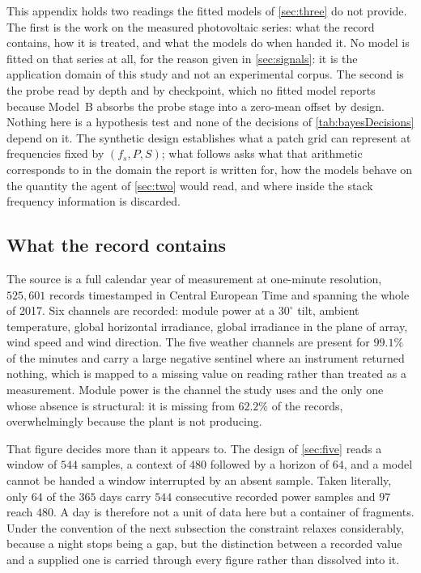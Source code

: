This appendix holds two readings the fitted models of \autoref{sec:three} do not provide. The first is the work on the measured photovoltaic series: what the record contains, how it is treated, and what the models do when handed it. No model is fitted on that series at all, for the reason given in \autoref{sec:signals}: it is the application domain of this study and not an experimental corpus. The second is the probe read by depth and by checkpoint, which no fitted model reports because Model~B absorbs the probe stage into a zero-mean offset by design. Nothing here is a hypothesis test and none of the decisions of \autoref{tab:bayesDecisions} depend on it. The synthetic design establishes what a patch grid can represent at frequencies fixed by $(f_s,P,S)$; what follows asks what that arithmetic corresponds to in the domain the report is written for, how the models behave on the quantity the agent of \autoref{sec:two} would read, and where inside the stack frequency information is discarded.

\subsection{What the record contains}

The source is a full calendar year of measurement at one-minute resolution, $525{,}601$ records timestamped in Central European Time and spanning the whole of 2017. Six channels are recorded: module power at a $30^\circ$ tilt, ambient temperature, global horizontal irradiance, global irradiance in the plane of array, wind speed and wind direction. The five weather channels are present for $99.1\%$ of the minutes and carry a large negative sentinel where an instrument returned nothing, which is mapped to a missing value on reading rather than treated as a measurement. Module power is the channel the study uses and the only one whose absence is structural: it is missing from $62.2\%$ of the records, overwhelmingly because the plant is not producing.

That figure decides more than it appears to. The design of \autoref{sec:five} reads a window of $544$ samples, a context of $480$ followed by a horizon of $64$, and a model cannot be handed a window interrupted by an absent sample. Taken literally, only $64$ of the $365$ days carry $544$ consecutive recorded power samples and $97$ reach $480$. A day is therefore not a unit of data here but a container of fragments. Under the convention of the next subsection the constraint relaxes considerably, because a night stops being a gap, but the distinction between a recorded value and a supplied one is carried through every figure rather than dissolved into it.

